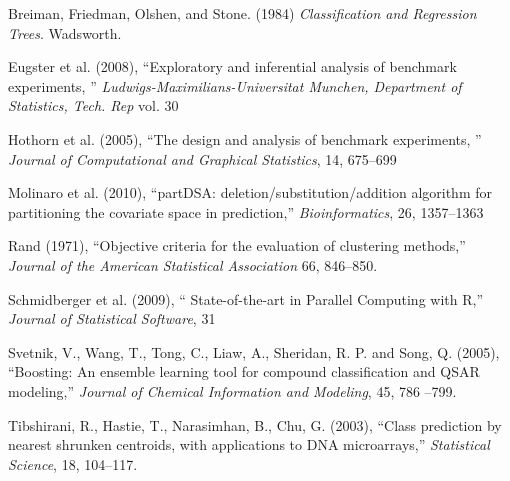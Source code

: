 \documentclass[12pt]{article}
\begin{document}
\begin{description}

  
\item Breiman, Friedman, Olshen, and Stone. (1984) {\it Classification
    and Regression Trees}. Wadsworth. 

\item Eugster et al. (2008),  ``Exploratory and inferential analysis
  of benchmark experiments, '' {\it Ludwigs-Maximilians-Universitat
    Munchen, Department of Statistics, Tech. Rep} vol. 30 
  
  
\item Hothorn et al. (2005),  ``The design and analysis of
  benchmark experiments, '' {\it Journal of Computational and
    Graphical Statistics}, 14,  675--699

  \item Molinaro et al. (2010), ``partDSA:
    deletion/substitution/addition algorithm for partitioning the
    covariate space in prediction,'' {\it Bioinformatics}, 26, 1357--1363

\item Rand (1971),  ``Objective criteria for the evaluation of
  clustering methods,'' {\it Journal of the American Statistical
    Association} 66, 846--850. 
    
\item Schmidberger et al. (2009), `` State-of-the-art in Parallel
  Computing with R,'' {\it Journal of Statistical Software}, 31
  
\item Svetnik, V., Wang, T., Tong, C., Liaw, A., Sheridan, R. P. and
  Song, Q. (2005), ``Boosting: An ensemble learning tool for compound
  classification and QSAR modeling,'' {\it Journal of Chemical
    Information and Modeling}, 45, 786 --799. 
  
\item Tibshirani, R., Hastie, T., Narasimhan, B., Chu, G. (2003),
  ``Class prediction by nearest shrunken centroids, with applications
  to DNA microarrays,'' {\it  Statistical Science}, 18, 104--117. 

\end{description}
\end{document}
